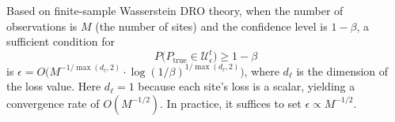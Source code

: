 \documentclass[10pt,journal,compsoc]{IEEEtran}
\begin{document}
Based on finite-sample Wasserstein DRO theory, when the number of observations is $M$ (the number of sites) and the confidence level is $1 - \beta$, a sufficient condition for
\begin{equation}
P\bigl(P_{\mathrm{true}} \in \mathcal{U}_\epsilon^t\bigr) \geq 1 - \beta
\end{equation}
is $\epsilon = O\bigl(M^{-1/\max(d_\ell, 2)} \cdot \log(1/\beta)^{1/\max(d_\ell, 2)}\bigr)$, where $d_\ell$ is the dimension of the loss value. Here $d_\ell = 1$ because each site's loss is a scalar, yielding a convergence rate of $O(M^{-1/2})$. In practice, it suffices to set $\epsilon \propto M^{-1/2}$.
\end{document}
